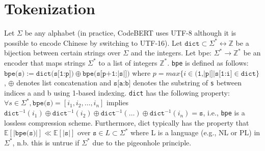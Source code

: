 \documentclass[usenames,dvipsnames]{article} %
\begin{document}
  \section{Tokenization}
  Let $\Sigma$ be any alphabet (in practice, CodeBERT uses UTF-8 although it is possible to encode Chinese by switching to UTF-16).
  Let $\texttt{dict} \subset \Sigma^*\leftrightarrow\mathbb Z$ be a bijection between certain strings over $\Sigma$ and the integers.
  Let bpe: $\Sigma^*\rightarrow\mathbb{Z}^*$ be an encoder that maps strings $\Sigma^*$ to a list of integers $\mathbb{Z}^*$.
  \texttt{bpe} is defined as follows: $\texttt{bpe(s)} := \texttt{dict(s[1:p])} \oplus \texttt{bpe(s[p+1:|s|])}$ where $p = max \{ i \in \texttt{(1,|p|]} | \texttt{s[1:i]} \in \texttt{dict} \}$, $\oplus$ denotes list concatenation and $\texttt{s[a:b]}$ denotes the substring of \texttt{s} between indices a and b using 1-based indexing.
  \texttt{dict} has the following property: $\forall s \in \Sigma^*, \texttt{bpe(s)} = [i_1, i_2, \ldots, i_n]$ implies $\texttt{dict}^{-1}(i_1) \oplus \texttt{dict}^{-1}(i_2) \oplus \texttt{dict}^{-1}(\ldots) \oplus \texttt{dict}^{-1}(i_n) = \texttt{s}$, i.e., \texttt{bpe} is a lossless compression scheme.
  Furthermore, dict typically has the property that $\mathbb{E}[|\texttt{bpe(s)}|] \ll \mathbb{E}[|\texttt{s}|]$ over $\texttt{s} \in L \subset \Sigma^*$ where L is a language (e.g., NL or PL) in $\Sigma^*$, n.b. this is untrue if $\Sigma^*$ due to the pigeonhole principle.
\end{document}
